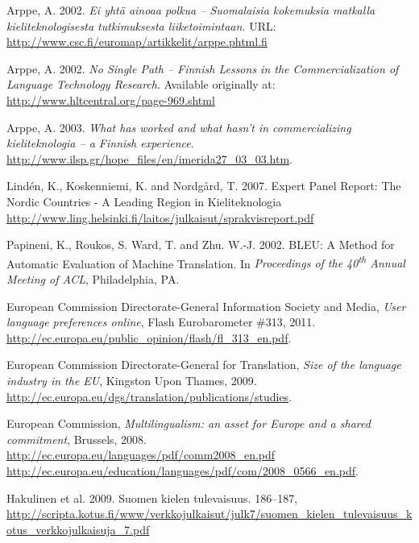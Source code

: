 \documentclass[]{../../metanetpaper}
\begin{document}
%
%  
%  
\begin{thebibliography}{102}\raggedright
{}
Arppe, A. 2002.
\emph{Ei yhtä ainoaa polkua -- Suomalaisia kokemuksia matkalla
      kieliteknologisesta tutkimuksesta liiketoimintaan.}
URL:
\url{http://www.csc.fi/euromap/artikkelit/arppe.phtml.fi}

Arppe, A. 2002.
\emph{No Single Path -- Finnish Lessons in the Commercialization of
      Language Technology Research}.
Available originally at:
\url{http://www.hltcentral.org/page-969.shtml}

Arppe, A. 2003.
\emph{What has worked and what hasn't in commercializing kieliteknologia --
      a Finnish experience}.
\url{http://www.ilsp.gr/hope_files/en/imerida27_03_03.htm}.

Lindén, K., Koskenniemi, K. and Nordgård, T. 2007. Expert Panel Report: The
Nordic Countries - A Leading Region in Kieliteknologia
\url{http://www.ling.helsinki.fi/laitos/julkaisut/sprakvisreport.pdf}

Papineni, K., Roukos, S. Ward, T. and Zhu. W.-J. 2002.
BLEU: A Method for Automatic Evaluation of Machine Translation.
In \emph{Proceedings of the 40\textsuperscript{th} Annual Meeting of ACL},
Philadelphia, PA.

European Commission Directorate-General Information Society and Media,
\emph{User language preferences online}, Flash Eurobarometer \#313, 2011.
\url{http://ec.europa.eu/public_opinion/flash/fl_313_en.pdf}.

European Commission Directorate-General for Translation,
\emph{Size of the language industry in the EU}, Kingston Upon Thames, 2009.
\url{http://ec.europa.eu/dgs/translation/publications/studies}.

European Commission,
\emph{Multilingualism: an asset for Europe and a shared commitment},
Brussels, 2008.
\url{http://ec.europa.eu/languages/pdf/comm2008_en.pdf}
\url{http://ec.europa.eu/education/languages/pdf/com/2008_0566_en.pdf}.

Hakulinen et al. 2009. Suomen kielen tulevaisuus. 186–187,
\url{http://scripta.kotus.fi/www/verkkojulkaisut/julk7/suomen_kielen_tulevaisuus_kotus_verkkojulkaisuja_7.pdf}


\end{thebibliography}
\end{document}
